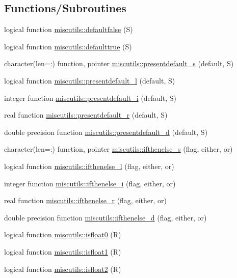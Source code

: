 \subsection*{Functions/\+Subroutines}
\begin{DoxyCompactItemize}
\item 
logical function \mbox{\hyperlink{namespacemiscutils_a9337630be33970a7cde8995bd73c58da}{miscutils\+::defaultfalse}} (S)
\item 
logical function \mbox{\hyperlink{namespacemiscutils_a3e4e42b3e3f4fbf064bb2e2b927c5604}{miscutils\+::defaulttrue}} (S)
\item 
character(len=\+:) function, pointer \mbox{\hyperlink{namespacemiscutils_aa4029af2cc791ce03e15abe363b19321}{miscutils\+::presentdefault\+\_\+s}} (default, S)
\item 
logical function \mbox{\hyperlink{namespacemiscutils_a990745dc5884aa0e44f6025bc182208e}{miscutils\+::presentdefault\+\_\+l}} (default, S)
\item 
integer function \mbox{\hyperlink{namespacemiscutils_aed7390d30a673aa276cdcc01a48c217a}{miscutils\+::presentdefault\+\_\+i}} (default, S)
\item 
real function \mbox{\hyperlink{namespacemiscutils_a7a5fc2947194e21c6a752c3897bcf7a3}{miscutils\+::presentdefault\+\_\+r}} (default, S)
\item 
double precision function \mbox{\hyperlink{namespacemiscutils_a218614e15a9b43ad29ae8c404825916f}{miscutils\+::presentdefault\+\_\+d}} (default, S)
\item 
character(len=\+:) function, pointer \mbox{\hyperlink{namespacemiscutils_a994af8094beca0770dd32924d0e7dbdb}{miscutils\+::ifthenelse\+\_\+s}} (flag, either, or)
\item 
logical function \mbox{\hyperlink{namespacemiscutils_a87ca2142c2922c2060f891b5bd3da8bb}{miscutils\+::ifthenelse\+\_\+l}} (flag, either, or)
\item 
integer function \mbox{\hyperlink{namespacemiscutils_ab0ad194bb45d05df1ffbf495275ff730}{miscutils\+::ifthenelse\+\_\+i}} (flag, either, or)
\item 
real function \mbox{\hyperlink{namespacemiscutils_aa5e8165f492c8bced78208b32802202b}{miscutils\+::ifthenelse\+\_\+r}} (flag, either, or)
\item 
double precision function \mbox{\hyperlink{namespacemiscutils_ae082d895d28505b733d2171cb6482378}{miscutils\+::ifthenelse\+\_\+d}} (flag, either, or)
\item 
logical function \mbox{\hyperlink{namespacemiscutils_a87ddeac831600aa6b24f14468911d710}{miscutils\+::isfloat0}} (R)
\item 
logical function \mbox{\hyperlink{namespacemiscutils_af3d292afdf769b0ef58f6cf1f6f0145d}{miscutils\+::isfloat1}} (R)
\item 
logical function \mbox{\hyperlink{namespacemiscutils_a64a47fd498b8846f96562efdd041adf4}{miscutils\+::isfloat2}} (R)
\end{DoxyCompactItemize}
